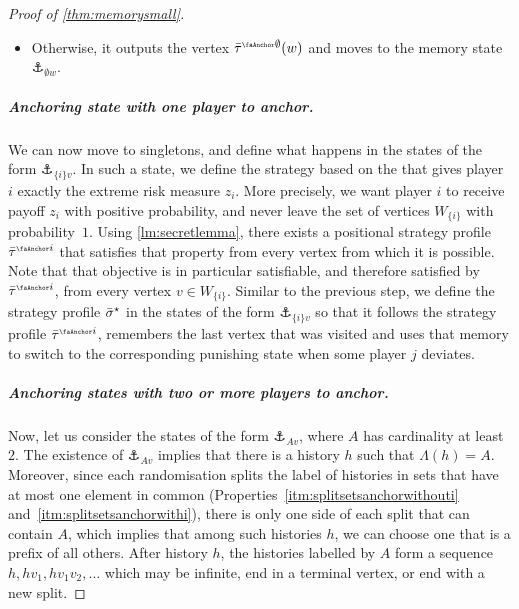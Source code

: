 \begin{proof}[Proof of \cref{thm:memorysmall}]
\begin{itemize}
        \item Otherwise, it outputs the vertex $\btau^{\anch \emptyset}(w)$ and moves to the memory state $\anchor_{\emptyset w}$.
    \end{itemize}

    \subparagraph*{Anchoring state with one player to anchor.}
    We can now move to singletons, and define what happens in the states of the form $\anchor_{\{i\} v}$.
    In such a state, we define the strategy based on the that gives player $i$ exactly the extreme risk measure $z_i$.
    More precisely, we want player $i$ to receive payoff $z_i$ with positive probability, and never leave the set of vertices $W_{\{i\}}$ with probability~$1$.
    Using \cref{lm:secretlemma}, there exists a positional strategy profile $\btau^{\anch i}$ that satisfies that property from every vertex from which it is possible.
    Note that that objective is in particular satisfiable, and therefore satisfied by $\btau^{\anch i}$, from every vertex $v \in W_{\{i\}}$.
    Similar to the previous step, we define the strategy profile ${\bar{\sigma}}^\star$ in the states of the form $\anchor_{\{i\} v}$ so that it follows the strategy profile $\btau^{\anch i}$, remembers the last vertex that was visited and uses that memory to switch to the corresponding punishing state when some player $j$ deviates.

        \subparagraph*{Anchoring states with two or more players to anchor.}
    Now, let us consider the states of the form $\anchor_{A v}$, where $A$ has cardinality at least $2$.
    The existence of $\anchor_{A v}$ implies that there is a history $h$ such that $\Lambda(h) = A$.
    Moreover, since each randomisation splits the label of histories in sets that have at most one element in common (Properties~\ref{itm:splitsetsanchorwithouti} and~\ref{itm:splitsetsanchorwithi}), there is only one side of each split that can contain $A$, which implies that among such histories $h$, we can choose one that is a prefix of all others.
    After history $h$, the histories labelled by $A$ form a sequence $h, hv_1, hv_1v_2, \dots$ which may be infinite, end in a terminal vertex, or end with a new split.
    


\end{proof}
